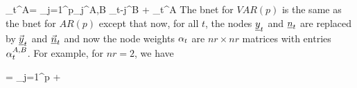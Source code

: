 \beq
\rvy_t^A=
\sum_{j=1}^p\alp_j^{A,B}
 \rvy_{t-j}^{B}
+ \rvn_t^A
\label{eq-var-def}
\eeq
The bnet for $VAR(p)$
is the same as the bnet
for  $AR(p)$
except that now,
for all $t$,
the nodes $\rvy_t$
and $\rvn_t$
are replaced by
$\vec{\rvy}_t$
and $\vec{\rvn}_t$
and now
the node weights $\alpha_t$
are $nr\times nr$
matrices
with entries $\alpha^{A,B}_t$.
For example, for $nr=2$, we have

{\renewcommand{\arraystretch}{1.5}
\beq
{}
=
\sum_{j=1}^p
+
\label{eq-var-2-def}
\eeq
}
